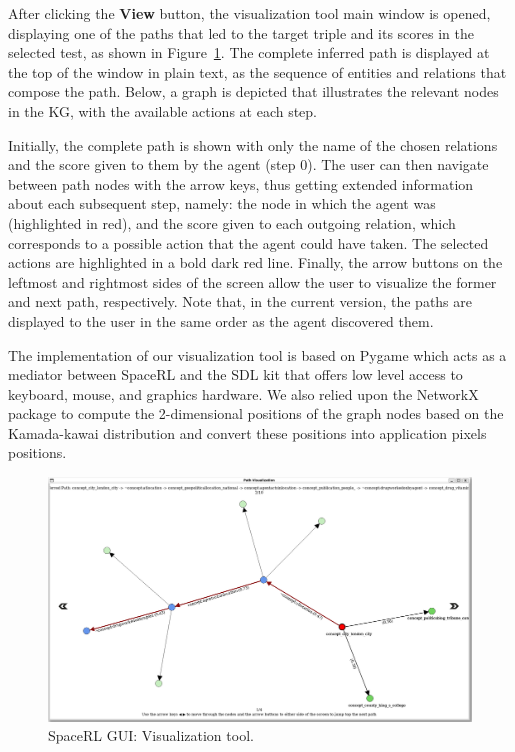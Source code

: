 After clicking the \textbf{View} button,  the visualization tool main window is opened, displaying one of the paths that led to the target triple and its scores in the selected test, as shown in Figure~\ref{fig:visualizer}. The complete inferred path is displayed at the top of the window in plain text, as the sequence of entities and relations that compose the path. Below, a graph is depicted that illustrates the relevant nodes in the KG, with the available actions at each step. 

Initially, the complete path is shown with only the name of the chosen relations and the score given to them by the agent (step 0). The user can then navigate between path nodes with the arrow keys, thus getting extended information about each subsequent step, namely: the node in which the agent was (highlighted in red), and the score given to each outgoing relation, which corresponds to a possible action that the agent could have taken. The selected actions are highlighted in a bold dark red line. Finally, the arrow buttons on the leftmost and rightmost sides of the screen allow the user to visualize the former and next path, respectively. Note that, in the current version, the paths are displayed to the user in the same order as the agent discovered them.

The implementation of our visualization tool is based on Pygame 
which acts as a mediator between SpaceRL and the SDL kit 
that offers low level access to keyboard, mouse, and graphics hardware. We also relied upon the NetworkX package 
to compute the 2-dimensional positions of the graph nodes based on the Kamada-kawai distribution 
and convert these positions into application pixels positions.

\begin{landscape}
    \begin{figure}[!h]
        \centering
        \includegraphics[width=1.65\textwidth]{fig/framework/GUI/Visualizer_2}
        \caption{SpaceRL GUI: Visualization tool.}
        \label{fig:visualizer}
    \end{figure}
\end{landscape}

